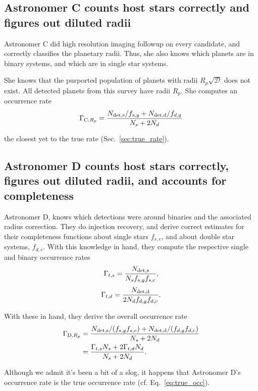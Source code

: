 \documentclass{emulateapj}
\begin{document}
\subsection{Astronomer C counts host stars correctly and figures out diluted 
radii}
Astronomer C did high resolution imaging followup on every candidate, and 
correctly classifies the planetary radii.
Thus, she also knows which planets are in binary systems, and which are in 
single star systems.

She knows that the purported population of planets with radii $R_p 
\sqrt{\mathcal{D}}$ does not exist. All detected planets from this survey have 
radii $R_p$. She computes an occurrence rate
\begin{equation}
\Gamma_{{\rm C},R_p} = 
\frac{N_{\rm det,s}/f_{s,g} + N_{\rm det,d}/f_{d,g}}{N_s + 2N_d}
\end{equation}

the closest yet to the true rate (Sec.~\ref{sec:true_rate}).


\subsection{Astronomer D counts host stars correctly, figures out diluted 
radii, 
and accounts for completeness}

Astronomer D, knows which detections were around 
binaries and the associated radius correction.
They do injection recovery, and derive correct estimates for their 
completeness functions about single stars $f_{s,c}$, and 
about double star systems, $f_{d,c}$.
With this knowledge in hand, they compute the respective single and binary 
occurrence rates
\begin{equation}
\Gamma_{t,s} = \frac{N_{\rm det,s}}{N_s f_{s,g} f_{s,c}},
\end{equation}
\begin{equation}
\Gamma_{t,d} = \frac{N_{\rm det,d}}{2 N_d f_{d,g} f_{d,c}}.
\end{equation}

With these in hand, they derive the overall occurrence rate
\begin{align}
\Gamma_{{\rm D}, R_p} 
&= \frac{N_{\rm det,s}/(f_{s,g}f_{s,c}) + N_{\rm det,d}/(f_{d,g}f_{d,c})  }{N_s 
+ 2 N_d} \\
&= \frac{\Gamma_{t,s} N_s + 2\Gamma_{t,d} N_d}{N_s + 2 N_d}.
\end{align}

Although we admit it's been a bit of a slog, it happens that Astronomer D's 
occurrence rate is the true occurrence rate (cf. Eq.~\ref{eq:true_occ}).
\end{document}
